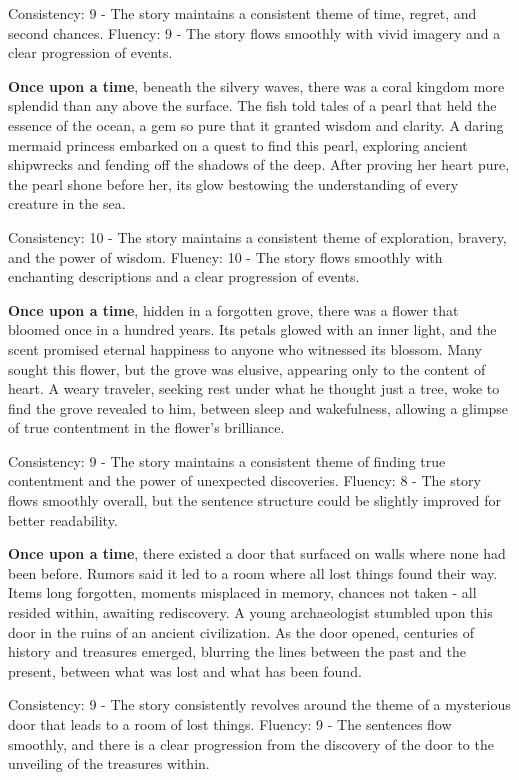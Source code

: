 \documentclass{article}
\begin{document}
Consistency: 9 - The story maintains a consistent theme of time, regret, and second chances.
Fluency: 9 - The story flows smoothly with vivid imagery and a clear progression of events.

\textbf{Once upon a time}, beneath the silvery waves, there was a coral kingdom more splendid than any above the surface. The fish told tales of a pearl that held the essence of the ocean, a gem so pure that it granted wisdom and clarity. A daring mermaid princess embarked on a quest to find this pearl, exploring ancient shipwrecks and fending off the shadows of the deep. After proving her heart pure, the pearl shone before her, its glow bestowing the understanding of every creature in the sea.

Consistency: 10 - The story maintains a consistent theme of exploration, bravery, and the power of wisdom.
Fluency: 10 - The story flows smoothly with enchanting descriptions and a clear progression of events.

\textbf{Once upon a time}, hidden in a forgotten grove, there was a flower that bloomed once in a hundred years. Its petals glowed with an inner light, and the scent promised eternal happiness to anyone who witnessed its blossom. Many sought this flower, but the grove was elusive, appearing only to the content of heart. A weary traveler, seeking rest under what he thought just a tree, woke to find the grove revealed to him, between sleep and wakefulness, allowing a glimpse of true contentment in the flower’s brilliance.

Consistency: 9 - The story maintains a consistent theme of finding true contentment and the power of unexpected discoveries.
Fluency: 8 - The story flows smoothly overall, but the sentence structure could be slightly improved for better readability.

\textbf{Once upon a time}, there existed a door that surfaced on walls where none had been before. Rumors said it led to a room where all lost things found their way. Items long forgotten, moments misplaced in memory, chances not taken - all resided within, awaiting rediscovery. A young archaeologist stumbled upon this door in the ruins of an ancient civilization. As the door opened, centuries of history and treasures emerged, blurring the lines between the past and the present, between what was lost and what has been found.

Consistency: 9 - The story consistently revolves around the theme of a mysterious door that leads to a room of lost things.
Fluency: 9 - The sentences flow smoothly, and there is a clear progression from the discovery of the door to the unveiling of the treasures within.
\end{document}
